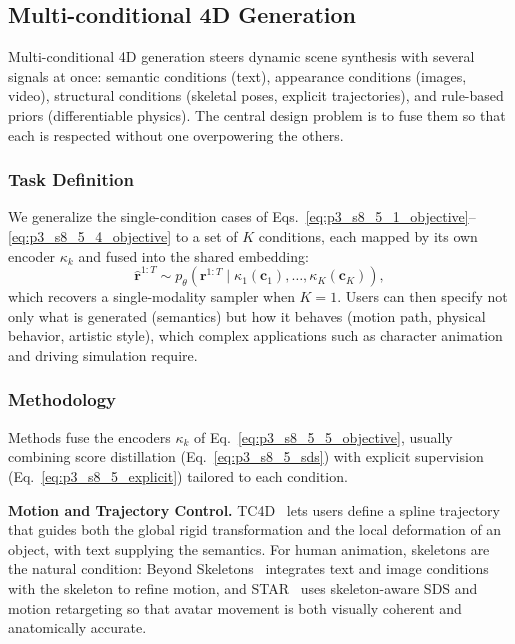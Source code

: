 

\subsection{Multi-conditional 4D Generation}
\label{subsec:p3_s8_5_5}
Multi-conditional 4D generation steers dynamic scene synthesis with several signals at once: semantic conditions (text), appearance conditions (images, video), structural conditions (skeletal poses, explicit trajectories), and rule-based priors (differentiable physics). The central design problem is to fuse them so that each is respected without one overpowering the others.

\subsubsection{Task Definition}
\label{subsubsec:p3_s8_5_5_task}
We generalize the single-condition cases of Eqs.~\eqref{eq:p3_s8_5_1_objective}--\eqref{eq:p3_s8_5_4_objective} to a set of $K$ conditions, each mapped by its own encoder $\kappa_k$ and fused into the shared embedding:
\begin{equation}
\label{eq:p3_s8_5_5_objective}
\hat{\mathbf{r}}^{1:T}\sim p_\theta\!\left(\mathbf{r}^{1:T}\mid \kappa_1(\mathbf{c}_1),\dots,\kappa_K(\mathbf{c}_K)\right),
\end{equation}
which recovers a single-modality sampler when $K=1$.
Users can then specify not only what is generated (semantics) but how it behaves (motion path, physical behavior, artistic style), which complex applications such as character animation and driving simulation require.

\subsubsection{Methodology}
\label{subsubsec:p3_s8_5_5_method}
Methods fuse the encoders $\kappa_k$ of Eq.~\eqref{eq:p3_s8_5_5_objective}, usually combining score distillation (Eq.~\eqref{eq:p3_s8_5_sds}) with explicit supervision (Eq.~\eqref{eq:p3_s8_5_explicit}) tailored to each condition.

\textbf{Motion and Trajectory Control.} TC4D~\cite{bahmani2024tc4d} lets users define a spline trajectory that guides both the global rigid transformation and the local deformation of an object, with text supplying the semantics. For human animation, skeletons are the natural condition: Beyond Skeletons~\cite{yang2024beyond} integrates text and image conditions with the skeleton to refine motion, and STAR~\cite{chai2024star} uses skeleton-aware SDS and motion retargeting so that avatar movement is both visually coherent and anatomically accurate.

